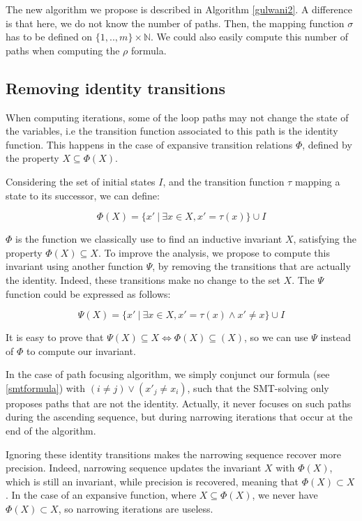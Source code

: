 \documentclass[a4paper,english,titlepage,11pt]{report}
\def\N{\mathbb{N}}
\begin{document}
The new algorithm we propose is described in Algorithm \ref{gulwani2}.
A difference is that here, we do not know the number of paths. Then, the mapping
function $\sigma$ has to be defined on $\{1,..,m\} \times \N$. We could also
easily compute this number of paths when computing the $\rho$ formula.


	\subsection{Removing identity transitions}

	When computing iterations, some of the loop paths may not change the state
	of the variables, i.e the transition function associated to this path is the
	identity function. This happens in the case of expansive transition
	relations $\Phi$, defined by the property $X \subseteq \Phi(X)$.

	Considering the set of initial states $I$, and the transition function 
	$\tau$ mapping a state to its successor, we can define:

	$$\Phi(X) = \{ x'\ |\ \exists x \in X, x' = \tau(x)\} \cup I$$

	$\Phi$ is the function we classically use to find an inductive invariant
	$X$, satisfying the property $\Phi(X) \subseteq X$. To improve the analysis,
	we propose to compute this invariant using another function $\Psi$, by
	removing the transitions that are actually the identity. Indeed, these
	transitions make no change to the set $X$.
	The $\Psi$ function could be expressed as follows:

	$$\Psi(X) = \{ x'\ |\ \exists x \in X, x' = \tau(x) \wedge x' \neq x\}
	\cup I$$

	It is easy to prove that $\Psi(X) \subseteq X \Leftrightarrow \Phi(X)
	\subseteq(X)$, so we can use $\Psi$ instead of $\Phi$ to compute our
	invariant.

	In the case of path focusing algorithm, we simply conjunct our formula
	(see \ref{smtformula}) with
	$(i \neq j) \vee (x'_j \neq x_i)$, such that the SMT-solving only proposes
	paths that are not the identity. Actually, it never focuses on such paths
	during the ascending sequence, but during narrowing iterations that occur 
	at the end of the algorithm.

	Ignoring these identity transitions makes the narrowing sequence recover
	more precision.
	Indeed, narrowing sequence updates the invariant $X$ with $\Phi(X)$, which
	is still an invariant, while precision is recovered, meaning that $\Phi(X)
	\subset X$. In the case of an expansive function, where $X \subseteq
	\Phi(X)$, we never have $\Phi(X) \subset X$, so narrowing iterations are
	useless.
\end{document}
